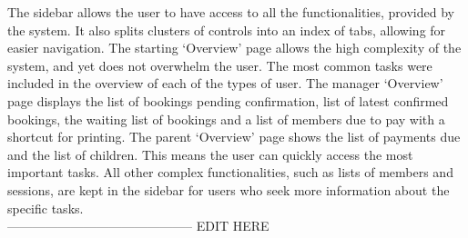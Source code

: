 \documentclass{l3proj}
\begin{document}
\par The sidebar allows the user to have access to all the functionalities, provided by the system. It also splits clusters of controls into an index of tabs, allowing for easier navigation. The starting `Overview' page allows the high complexity of the system, and yet does not overwhelm the user. The most common tasks were included in the overview of each of the types of user. The manager `Overview' page displays the list of bookings pending confirmation, list of latest confirmed bookings, the waiting list of bookings and a list of members due to pay with a shortcut for printing. The parent `Overview' page shows the list of payments due and the list of children. This means the user can quickly access the most important tasks. All other complex functionalities, such as lists of members and sessions, are kept in the sidebar for users who seek more information about the specific tasks.\\
--------------------------------------------
{\LARGE{EDIT HERE}}


\end{document}
